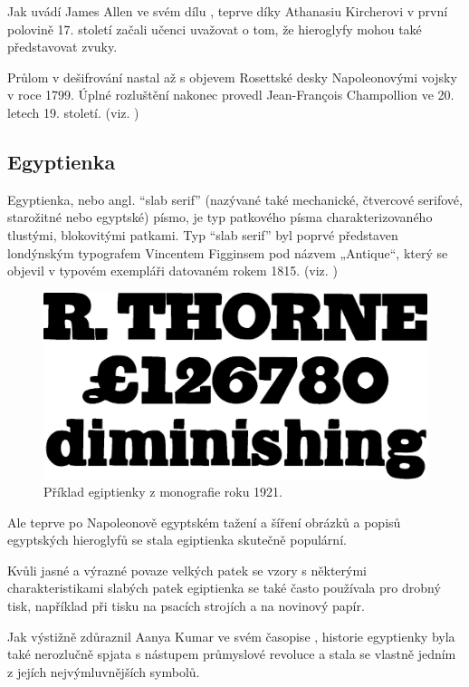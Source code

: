 \documentclass[a4paper, 11pt]{article}
\begin{document}
Jak uvádí James Allen ve svém dílu \cite{middle_egyptian}, teprve díky Athanasiu Kircherovi v první polovině 17. století začali učenci uvažovat o tom, že hieroglyfy mohou také představovat zvuky.

Průlom v dešifrování nastal až s objevem Rosettské desky Napoleonovými vojsky v roce 1799. Úplné rozluštění nakonec provedl Jean-François Champollion ve 20. letech 19. století. (viz. \cite{egypt_today})
\subsection{Egyptienka}
Egyptienka, nebo angl. ``slab serif'' (nazývané také mechanické, čtvercové serifové, starožitné nebo egyptské) písmo, je typ patkového písma charakterizovaného tlustými, blokovitými patkami. Typ ``slab serif'' byl poprvé představen londýnským typografem Vincentem Figginsem pod názvem „Antique“, který se objevil v typovém exempláři datovaném rokem 1815. (viz. \cite{slab_serif_england}\cite{iveta_dvokov})
\begin{figure}[htb]
\centering
\includegraphics[scale=0.3]{slab_serif.eps}
\caption{Příklad egiptienky z monografie roku 1921. \cite{keith_tam}}
\end{figure}

Ale teprve po Napoleonově egyptském tažení a šíření obrázků a popisů egyptských hieroglyfů se stala egiptienka skutečně populární.

Kvůli jasné a výrazné povaze velkých patek se vzory s některými charakteristikami slabých patek egiptienka se také často používala pro drobný tisk, například při tisku na psacích strojích a na novinový papír.

Jak výstižně zdůraznil Aanya Kumar ve svém časopise \cite{aanya_kumar}, historie egyptienky byla také nerozlučně spjata s nástupem průmyslové revoluce a stala se vlastně jedním z jejích nejvýmluvnějších symbolů.
\newpage

\renewcommand{\refname}{Literatura}

\end{document}
